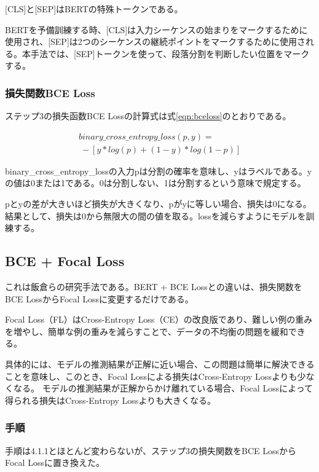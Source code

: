 \documentclass[
  platex, dvipdfmx,  %
]{nlp2021}
\begin{document}
[CLS]と[SEP]はBERTの特殊トークンである。

BERTを予備訓練する時、[CLS]は入力シーケンスの始まりをマークするために使用され、[SEP]は2つのシーケンスの継続ポイントをマークするために使用される。本手法では、[SEP]トークンを使って、段落分割を判断したい位置をマークする。

\subsubsection{損失関数BCE Loss}

ステップ3の損失函数BCE Lossの計算式は式\ref{eqn:bceloss}のとおりである。

\begin{equation}
  \label{eqn:bceloss}
  \begin{split}
    binary\_cross\_entropy\_loss(p, y) = \\
    \ - [ y * log(p)+(1-y)*log(1-p)]  
  \end{split}
\end{equation}

binary\_cross\_entropy\_lossの入力pは分割の確率を意味し、yはラベルである。yの値は0または1である。0は分割しない、1は分割するという意味で規定する。

pとyの差が大きいほど損失が大きくなり、pがyに等しい場合、損失は0になる。結果として、損失は0から無限大の間の値を取る。lossを減らすようにモデルを訓練する。

\subsection{BCE + Focal Loss}


これは飯倉らの研究手法である。BERT + BCE Lossとの違いは、損失関数をBCE LossからFocal Lossに変更するだけである。

Focal Loss（FL）はCross-Entropy Loss（CE）の改良版であり、難しい例の重みを増やし、簡単な例の重みを減らすことで、データの不均衡の問題を緩和できる。

具体的には、モデルの推測結果が正解に近い場合、この問題は簡単に解決できることを意味し、このとき、Focal Lossによる損失はCross-Entropy Lossよりも少なくなる。 モデルの推測結果が正解からかけ離れている場合、Focal Lossによって得られる損失はCross-Entropy Lossよりも大きくなる。

\subsubsection{手順}

手順は4.1.1とほとんど変わらないが、ステップ3の損失関数をBCE LossからFocal Lossに置き換えた。
\end{document}
